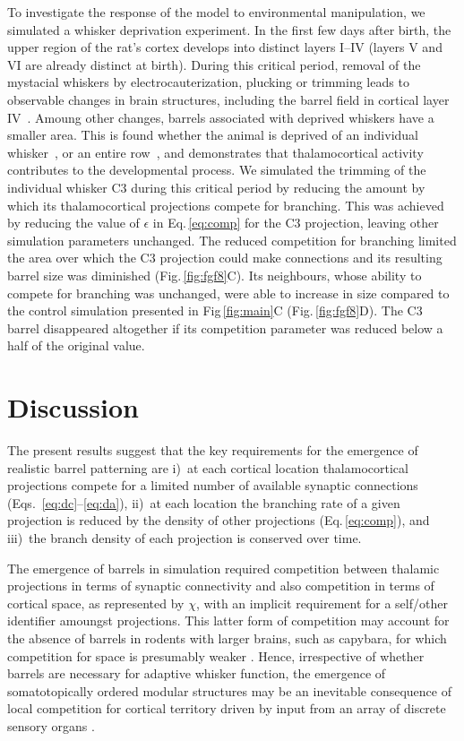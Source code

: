 \documentclass[9pt,lineno]{elife}
\newcommand{\MPthreePred}[1]{\textcolor{revorange}{#1}}
\begin{document}
\MPthreePred{To investigate the response of the model to environmental
  manipulation, we simulated a whisker deprivation experiment. In the first
  few days after birth, the upper region of the rat's cortex develops into
  distinct layers I--IV (layers V and VI are already distinct at
  birth). During this critical period, removal of the mystacial whiskers by
  electrocauterization, plucking or trimming leads to observable changes in
  brain structures, including the barrel field in cortical layer
  IV~\citep{jeanmonod_mouse_1981}. Amoung other changes, barrels associated
  with deprived whiskers have a smaller area. This is found whether the animal
  is deprived of an individual whisker~\citep{kossut_effects_1992}, or an
  entire row~\citep{loos_somatosensory_1973}, and demonstrates that
  thalamocortical activity contributes to the developmental process. We
  simulated the trimming of the individual whisker C3 during this critical
  period by reducing the amount by which its thalamocortical projections
  compete for branching. This was achieved by reducing the value of $\epsilon$
  in Eq.\,\ref{eq:comp} for the C3 projection, leaving other simulation
  parameters unchanged. The reduced competition for branching limited the area
  over which the C3 projection could make connections and its resulting barrel
  size was diminished (Fig.\,\ref{fig:fgf8}C). Its neighbours, whose
  ability to compete for branching was unchanged, were able to increase in
  size compared to the control simulation presented in Fig\,\ref{fig:main}C
  (Fig.\,\ref{fig:fgf8}D). The C3 barrel disappeared altogether if its
  competition parameter was reduced below a half of the original value.}

\section{Discussion}

The present results suggest that the key requirements for the emergence of
realistic barrel patterning are i)~at each cortical location thalamocortical
projections compete for a limited number of available synaptic connections
(Eqs.~\ref{eq:dc}--\ref{eq:da}), ii)~at each location the branching rate of a
given projection is reduced by the density of other projections
(Eq.\,\ref{eq:comp}), and iii)~the branch density of each projection is
conserved over time.

The emergence of barrels in simulation required competition between thalamic
projections in terms of synaptic connectivity and also competition in terms of
cortical space, as represented by $\chi$, with an implicit requirement for a
self/other identifier amoungst projections. This latter form of competition may account for the absence of barrels in rodents with larger brains, such as
capybara, for which competition for space is presumably weaker
\citep{woolsey_comparative_1975}. Hence, irrespective of whether barrels are
necessary for adaptive whisker function, the emergence of somatotopically
ordered modular structures may be an inevitable consequence of local
competition for cortical territory driven by input from an array of discrete
sensory organs \citep{purves_iterated_1992}.
\end{document}
